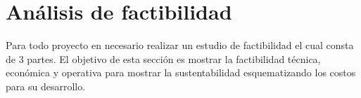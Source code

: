 \section{Análisis de factibilidad}

Para todo proyecto en necesario realizar un estudio de factibilidad el cual consta de 3 partes. El objetivo de esta sección es mostrar la factibilidad técnica, económica y operativa para mostrar la sustentabilidad esquematizando los costos para su desarrollo.
